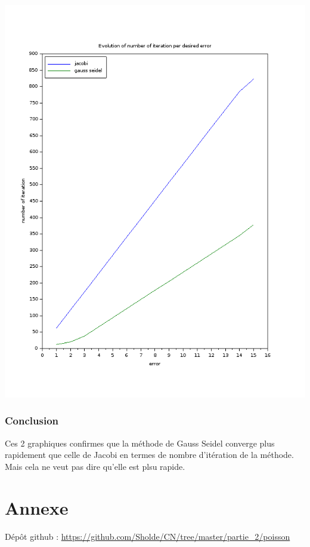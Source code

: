 \documentclass[11pt]{article}
\begin{document}
\includegraphics[scale=0.5]{img/error.png}

\subsubsection{Conclusion}

Ces 2 graphiques confirmes que la méthode de Gauss Seidel converge
plus rapidement que celle de Jacobi en termes de nombre d'itération de
la méthode. Mais cela ne veut pas dire qu'elle est plsu rapide.

\section{Annexe}

Dépôt github : \url{https://github.com/Sholde/CN/tree/master/partie_2/poisson}
\end{document}
